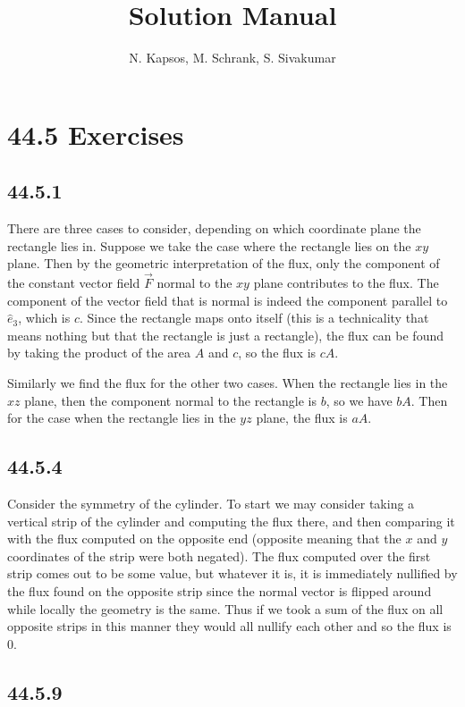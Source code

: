 \documentclass{article}
\title{Solution Manual}
\author{N. Kapsos, M. Schrank, S. Sivakumar}
\date{}
\begin{document}
\maketitle
\setcounter{secnumdepth}{0}

\section{44.5 Exercises}

\subsection{44.5.1}

There are three cases to consider, depending on which coordinate plane the rectangle lies in. Suppose we take the case where the rectangle lies on the $xy$ plane. Then by the geometric interpretation of the flux, only the component of the constant vector field $\vec{F}$ normal to the $xy$ plane contributes to the flux. The component of the vector field that is normal is indeed the component parallel to $\hat{e}_3$, which is $c$. Since the rectangle maps onto itself (this is a technicality that means nothing but that the rectangle is just a rectangle), the flux can be found by taking the product of the area $A$ and $c$, so the flux is $cA$.

Similarly we find the flux for the other two cases. When the rectangle lies in the $xz$ plane, then the component normal to the rectangle is $b$, so we have $bA$. Then for the case when the rectangle lies in the $yz$ plane, the flux is $aA$.

\subsection{44.5.4}

Consider the symmetry of the cylinder. To start we may consider taking a vertical strip of the cylinder and computing the flux there, and then comparing it with the flux computed on the opposite end (opposite meaning that the $x$ and $y$ coordinates of the strip were both negated). The flux computed over the first strip comes out to be some value, but whatever it is, it is immediately nullified by the flux found on the opposite strip since the normal vector is flipped around while locally the geometry is the same. Thus if we took a sum of the flux on all opposite strips in this manner they would all nullify each other and so the flux is $0$.

\subsection{44.5.9}
\end{document}
